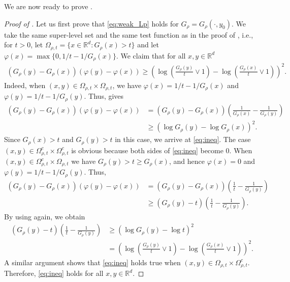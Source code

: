 \documentclass[reqno]{amsart}
\theoremstyle{plain}
\theoremstyle{definition}
\numberwithin{equation}{section}
\newcommand{\Rd}{\mathbb{R}^d}
\begin{document}
We are now ready to prove .

\begin{proof} [Proof of ]
Let us first prove that \eqref{eq:weak_Lp} holds for $G_{\rho}=G_{\rho}(\cdot, y_{0})$. We take the same super-level set and the same test function as in the proof of
\cite[Proposition 3.1]{KaSt02}, i.e., for $t > 0$, let $\Omega_{\rho, t} = \lbrace x \in \Rd: 
G_{\rho}(x) > t \rbrace$ and let $\varphi(x) = \max \lbrace 0, 1/t-1/G_{\rho}(x) \rbrace$.
We claim that for all $x, y \in \Rd$
\begin{align} \label{eq:ineq}
(G_{\rho}(y) - G_{\rho}(x)) (\varphi(y) - \varphi(x))
\geq \left( \log \left( \frac{G_{\rho}(y)}{t} \lor 1 \right) 
- \log \left( \frac{G_{\rho}(x)}{t} \lor 1 \right) \right)^2. 
\end{align}
Indeed, when $(x, y) \in \Omega_{\rho, t} \times \Omega_{\rho, t}$, we have $\varphi(x) = 1/t 
- 1/G_{\rho}(x)$ and $\varphi(y) = 1/t - 1/G_{\rho}(y)$. Thus,  gives
\begin{align*}
(G_{\rho}(y) - G_{\rho}(x))(\varphi(y) - \varphi(x)) 
&= (G_{\rho}(y) - G_{\rho}(x)) \left( \frac{1}{G_{\rho}(x)} - \frac{1}{G_{\rho}(y)} \right) \\
&\geq \left( \log G_{\rho}(y) - \log G_{\rho}(x) \right)^2.
\end{align*}
Since $G_{\rho}(x) > t$ and $G_{\rho}(y) > t$ in this case, we arrive at \eqref{eq:ineq}. 
The case $(x, y) \in \Omega_{\rho, t}^c \times \Omega_{\rho, t}^{c}$ is obvious 
because both sides of \eqref{eq:ineq} become 0.
When $(x, y) \in \Omega_{\rho, t}^{c} \times \Omega_{\rho, t}$ we have $G_{\rho}(y) > t \geq G_{\rho}(x)$, 
and hence $\varphi(x) = 0$ and $\varphi(y) = 1/t - 1/G_{\rho}(y)$. Thus,
\begin{align*}
(G_{\rho}(y) - G_{\rho}(x))(\varphi(y) - \varphi(x)) 
&= (G_{\rho}(y) - G_{\rho}(x)) \left( \frac{1}{t} - \frac{1}{G_{\rho}(y)} \right) \\
&\geq (G_{\rho}(y) - t) \left( \frac{1}{t} - \frac{1}{G_{\rho}(y)} \right).
\end{align*}
By using  again, we obtain
\begin{align*}
(G_{\rho}(y) - t) \left( \frac{1}{t} - \frac{1}{G_{\rho}(y)} \right)
&\geq \left( \log G_{\rho}(y) - \log t \right)^2 \\
&= \left( \log \left( \frac{G_{\rho}(y)}{t} \lor 1 \right) 
- \log \left( \frac{G_{\rho}(x)}{t} \lor 1 \right) \right)^2.
\end{align*}
A similar argument shows that \eqref{eq:ineq} holds true when $(x,y) \in \Omega_{\rho, t} \times \Omega_{\rho, t}^{c}$. Therefore, \eqref{eq:ineq} holds for all $x, y \in \Rd$.


\end{proof}
\end{document}
